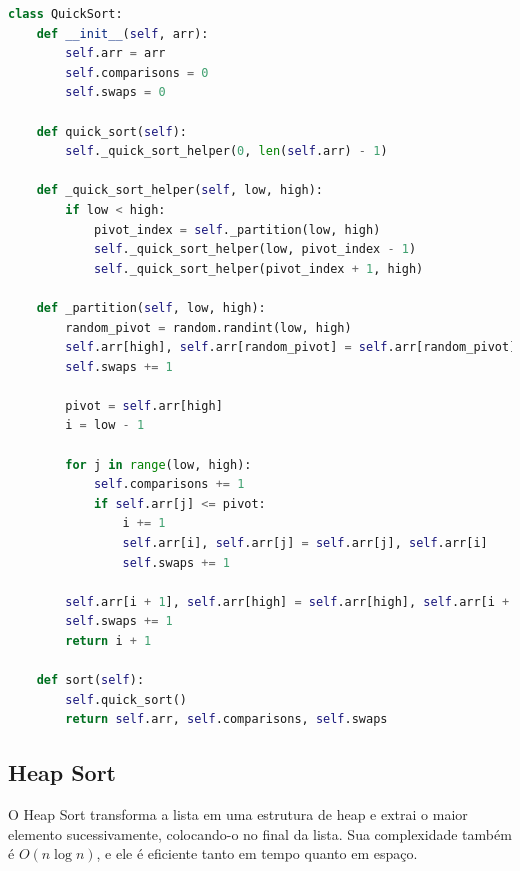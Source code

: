 \documentclass[tcc1,project]{uftex}
\begin{document}
\begin{lstlisting}[language=python, caption=QuickSort]
class QuickSort:
    def __init__(self, arr):
        self.arr = arr
        self.comparisons = 0
        self.swaps = 0

    def quick_sort(self):
        self._quick_sort_helper(0, len(self.arr) - 1)

    def _quick_sort_helper(self, low, high):
        if low < high:
            pivot_index = self._partition(low, high)
            self._quick_sort_helper(low, pivot_index - 1)
            self._quick_sort_helper(pivot_index + 1, high)

    def _partition(self, low, high):
        random_pivot = random.randint(low, high)
        self.arr[high], self.arr[random_pivot] = self.arr[random_pivot], self.arr[high]
        self.swaps += 1

        pivot = self.arr[high]
        i = low - 1

        for j in range(low, high):
            self.comparisons += 1
            if self.arr[j] <= pivot:
                i += 1
                self.arr[i], self.arr[j] = self.arr[j], self.arr[i]
                self.swaps += 1

        self.arr[i + 1], self.arr[high] = self.arr[high], self.arr[i + 1]
        self.swaps += 1
        return i + 1

    def sort(self):
        self.quick_sort()
        return self.arr, self.comparisons, self.swaps
\end{lstlisting}

\subsection{Heap Sort}
O Heap Sort transforma a lista em uma estrutura de heap e extrai o maior elemento sucessivamente, colocando-o no final da lista. Sua complexidade também é $O(n \log n)$, e ele é eficiente tanto em tempo quanto em espaço.
\end{document}
